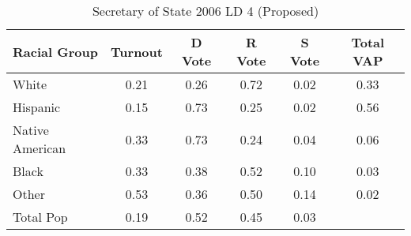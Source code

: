 \begin{table}[htb]
\begin{center}
\caption{Secretary of State 2006 LD 4 (Proposed)}
\label{sos06_vap_ld_4}
\begin{tabular}{lccccc}
  \hline
Racial Group & Turnout & D Vote & R Vote & S Vote & Total VAP \\ 
  \hline
White & 0.21 & 0.26 & 0.72 & 0.02 & 0.33 \\ 
  Hispanic & 0.15 & 0.73 & 0.25 & 0.02 & 0.56 \\ 
  Native American & 0.33 & 0.73 & 0.24 & 0.04 & 0.06 \\ 
  Black & 0.33 & 0.38 & 0.52 & 0.10 & 0.03 \\ 
  Other & 0.53 & 0.36 & 0.50 & 0.14 & 0.02 \\ 
  Total Pop & 0.19 & 0.52 & 0.45 & 0.03 &  \\ 
   \hline
\end{tabular}
\end{center}
\end{table}
